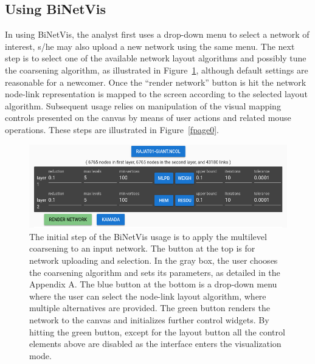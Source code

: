 \documentclass[runningheads]{llncs}
\begin{document}
\subsection{Using BiNetVis}\label{use}
In using BiNetVis, the analyst first uses a drop-down menu to select a network of interest, s/he may also upload a new network using the same menu. The next step is to select one of the available network layout algorithms and possibly tune the coarsening algorithm, as illustrated in Figure~\ref{initial}, although default settings are reasonable for a newcomer.
Once the ``render network'' button is hit the network node-link representation is mapped to the screen according to the selected layout algorithm.
Subsequent usage relies on manipulation of the visual mapping controls presented on the
canvas by means of user actions and related mouse operations.
These steps are illustrated in Figure~\ref{fpage0}.

\begin{figure}\centering
 \includegraphics[width=\textwidth]{initial_}
  \caption{The initial step of the BiNetVis usage is to apply the multilevel coarsening to an input network.
  The button at the top is for network uploading and selection.
  In the gray box, the user chooses the coarsening algorithm and sets its parameters, as detailed in the Appendix A. %
  The blue button at the bottom is a drop-down menu where the user can select the node-link layout algorithm, where multiple alternatives are provided.
  The green button renders the network to the canvas and initializes further control widgets.
  By hitting the green button, except for the layout  button all the control elements above are disabled as the interface enters the visualization mode.
  }\label{initial}
\end{figure}
\end{document}

